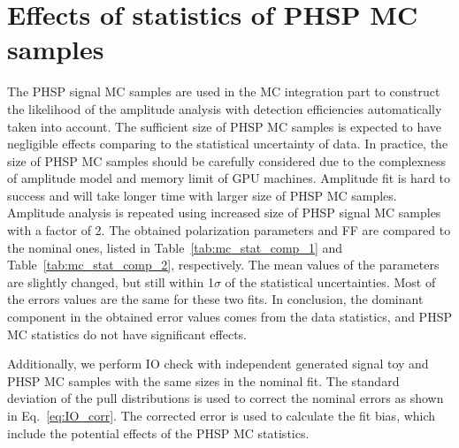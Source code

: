 \section{Effects of statistics of PHSP MC samples}
\label{app:mc_statistics}

The PHSP signal MC samples are used in the MC integration part to construct the likelihood of the amplitude analysis with detection efficiencies automatically taken into account. The sufficient size of PHSP MC samples is expected to have negligible effects comparing to the statistical uncertainty of data. In practice, the size of PHSP MC samples should be carefully considered due to the complexness of amplitude model and memory limit of GPU machines. Amplitude fit is hard to success and will take longer time with larger size of PHSP MC samples.
Amplitude analysis is repeated using increased size of PHSP signal MC samples with a factor of 2. The obtained polarization parameters and FF are compared to the nominal ones, listed in Table~\ref{tab:mc_stat_comp_1} and Table~\ref{tab:mc_stat_comp_2}, respectively. The mean values of the parameters are slightly changed, but still within 1$\sigma$ of the statistical uncertainties. Most of the errors values are the same for these two fits. In conclusion, the dominant component in the obtained error values comes from the data statistics, and PHSP MC statistics do not have significant effects. 

Additionally, we perform IO check with independent generated signal toy and PHSP MC samples with the same sizes in the nominal fit. The standard deviation of the pull distributions is used to correct the nominal errors as shown in Eq.~\ref{eq:IO_corr}. The corrected error is used to calculate the fit bias, which include the potential effects of the PHSP MC statistics. 

